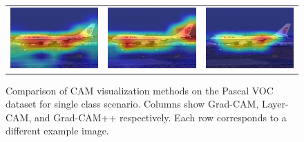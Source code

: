 \begin{figure}[!t]
\begin{center}
{\begin{tabular}{c c c}
        \includegraphics[width=0.18\linewidth, height=0.18\linewidth]{figures/cams/gradcam/2008_003976_0} &
        \includegraphics[width=0.18\linewidth, height=0.18\linewidth]{figures/cams/layercam/2008_003976_0} &
        \includegraphics[width=0.18\linewidth, height=0.18\linewidth]{figures/cams/gradcampp/2008_003976_0} \\

      \end{tabular}
    }
  \end{center}

  \caption{Comparison of CAM visualization methods on the Pascal VOC dataset for single class scenario. Columns show Grad-CAM, Layer-CAM, and Grad-CAM++ respectively. Each row corresponds to a different example image.}
  \label{fig:cam_variation_singleclass}
\end{figure}


